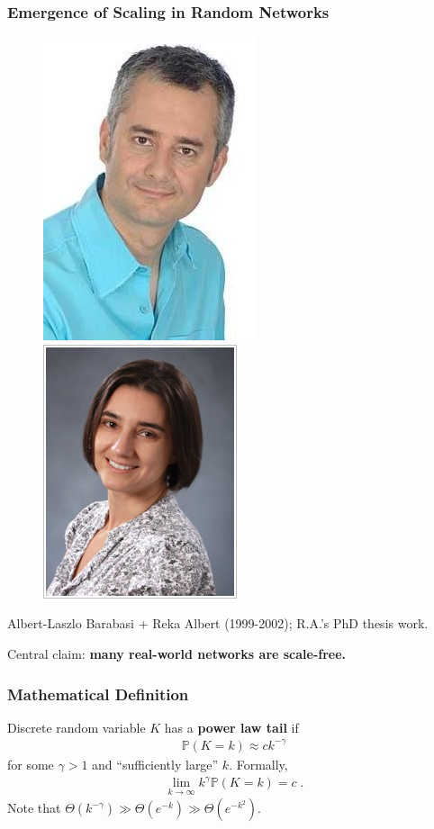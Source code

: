 \documentclass{beamer}
\newcommand\prob[0]{\mathbb{P}}
\begin{document}
		\begin{frame}\frametitle{Emergence of Scaling in Random Networks}
			\begin{figure}
				\centering
				\includegraphics[width=.3\textwidth]{barabasicropped}
				\includegraphics[width=.3\textwidth]{ralbert-photo}
			\end{figure}

			Albert-Laszlo Barabasi + Reka Albert (1999-2002); R.A.'s PhD thesis work.
			
			\pause Central claim: \textbf{many real-world networks are scale-free.}
		
		
		\end{frame}

		
		\begin{frame}\frametitle{Mathematical Definition}
			Discrete random variable $K$ has a \textbf{power law tail} if  
			\begin{align*}
				\prob(K = k) \approx c k^{-\gamma}
			\end{align*}
			for some $\gamma > 1$ and ``sufficiently large'' $k$.
			Formally, 
			\begin{align*}
				\lim_{k \rightarrow \infty} k^\gamma \prob(K = k) = c\;.
			\end{align*}
			Note that $\Theta(k^{-\gamma}) \gg \Theta(e^{-k}) \gg \Theta(e^{-k^2})$. 
		\end{frame}
\end{document}
